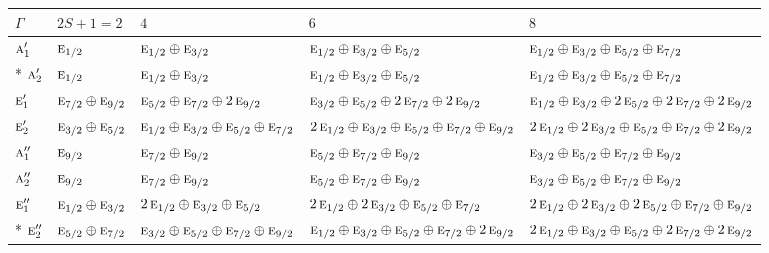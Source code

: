 \documentclass[10pt,a4paper]{article}
\numberwithin{equation}{section}
\newcommand{\irr}[1]{\text{\normalfont\scshape #1}}
\begin{document}
{\small\setlength{\tabcolsep}{3pt}\begin{longtable}{@{}l>{\RaggedRight\arraybackslash}p{}>{\RaggedRight\arraybackslash}p{}>{\RaggedRight\arraybackslash}p{}>{\RaggedRight\arraybackslash}p{}@{}}\toprule
$\Gamma$ & $2S + 1 = 2$ & $4$ & $6$ & $8$\\\midrule\endhead
\bottomrule\endfoot\endlastfoot
$\irr{a}_{1}'$ & $\irr{e}_{1/2}$ & $\irr{e}_{1/2}\oplus \irr{e}_{3/2}$ & $\irr{e}_{1/2}\oplus \irr{e}_{3/2}\oplus \irr{e}_{5/2}$ & $\irr{e}_{1/2}\oplus \irr{e}_{3/2}\oplus \irr{e}_{5/2}\oplus \irr{e}_{7/2}$\\*
$\irr{a}_{2}'$ & $\irr{e}_{1/2}$ & $\irr{e}_{1/2}\oplus \irr{e}_{3/2}$ & $\irr{e}_{1/2}\oplus \irr{e}_{3/2}\oplus \irr{e}_{5/2}$ & $\irr{e}_{1/2}\oplus \irr{e}_{3/2}\oplus \irr{e}_{5/2}\oplus \irr{e}_{7/2}$\\
$\irr{e}_{1}'$ & $\irr{e}_{7/2}\oplus \irr{e}_{9/2}$ & $\irr{e}_{5/2}\oplus \irr{e}_{7/2}\oplus 2\,\irr{e}_{9/2}$ & $\irr{e}_{3/2}\oplus \irr{e}_{5/2}\oplus 2\,\irr{e}_{7/2}\oplus 2\,\irr{e}_{9/2}$ & $\irr{e}_{1/2}\oplus \irr{e}_{3/2}\oplus 2\,\irr{e}_{5/2}\oplus 2\,\irr{e}_{7/2}\oplus 2\,\irr{e}_{9/2}$\\
$\irr{e}_{2}'$ & $\irr{e}_{3/2}\oplus \irr{e}_{5/2}$ & $\irr{e}_{1/2}\oplus \irr{e}_{3/2}\oplus \irr{e}_{5/2}\oplus \irr{e}_{7/2}$ & $2\,\irr{e}_{1/2}\oplus \irr{e}_{3/2}\oplus \irr{e}_{5/2}\oplus \irr{e}_{7/2}\oplus \irr{e}_{9/2}$ & $2\,\irr{e}_{1/2}\oplus 2\,\irr{e}_{3/2}\oplus \irr{e}_{5/2}\oplus \irr{e}_{7/2}\oplus 2\,\irr{e}_{9/2}$\\
$\irr{a}_{1}''$ & $\irr{e}_{9/2}$ & $\irr{e}_{7/2}\oplus \irr{e}_{9/2}$ & $\irr{e}_{5/2}\oplus \irr{e}_{7/2}\oplus \irr{e}_{9/2}$ & $\irr{e}_{3/2}\oplus \irr{e}_{5/2}\oplus \irr{e}_{7/2}\oplus \irr{e}_{9/2}$\\
$\irr{a}_{2}''$ & $\irr{e}_{9/2}$ & $\irr{e}_{7/2}\oplus \irr{e}_{9/2}$ & $\irr{e}_{5/2}\oplus \irr{e}_{7/2}\oplus \irr{e}_{9/2}$ & $\irr{e}_{3/2}\oplus \irr{e}_{5/2}\oplus \irr{e}_{7/2}\oplus \irr{e}_{9/2}$\\
$\irr{e}_{1}''$ & $\irr{e}_{1/2}\oplus \irr{e}_{3/2}$ & $2\,\irr{e}_{1/2}\oplus \irr{e}_{3/2}\oplus \irr{e}_{5/2}$ & $2\,\irr{e}_{1/2}\oplus 2\,\irr{e}_{3/2}\oplus \irr{e}_{5/2}\oplus \irr{e}_{7/2}$ & $2\,\irr{e}_{1/2}\oplus 2\,\irr{e}_{3/2}\oplus 2\,\irr{e}_{5/2}\oplus \irr{e}_{7/2}\oplus \irr{e}_{9/2}$\\*
$\irr{e}_{2}''$ & $\irr{e}_{5/2}\oplus \irr{e}_{7/2}$ & $\irr{e}_{3/2}\oplus \irr{e}_{5/2}\oplus \irr{e}_{7/2}\oplus \irr{e}_{9/2}$ & $\irr{e}_{1/2}\oplus \irr{e}_{3/2}\oplus \irr{e}_{5/2}\oplus \irr{e}_{7/2}\oplus 2\,\irr{e}_{9/2}$ & $2\,\irr{e}_{1/2}\oplus \irr{e}_{3/2}\oplus \irr{e}_{5/2}\oplus 2\,\irr{e}_{7/2}\oplus 2\,\irr{e}_{9/2}$\\
\bottomrule\end{longtable}}
\end{document}
